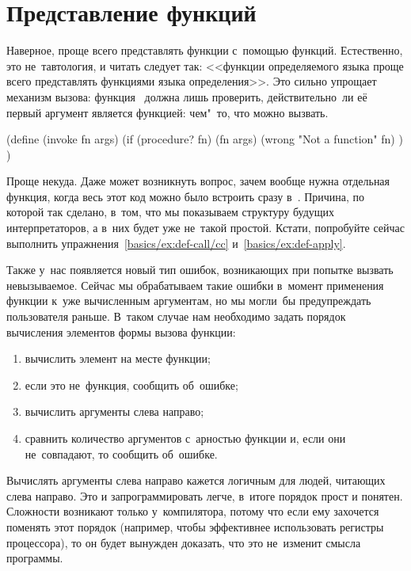 \section{Представление функций}\label{basics/sect:representing-functions}

Наверное, проще всего представлять функции с~помощью функций. Естественно, это
не~тавтология, и читать следует так: <<функции определяемого языка проще всего
представлять функциями языка определения>>. Это сильно упрощает механизм вызова:
функция~ должна лишь проверить, действительно~ли её первый аргумент
является функцией: чем"~то, что можно вызвать.

\begin{code:lisp}
(define (invoke fn args)
  (if (procedure? fn) (fn args)
      (wrong "Not a function" fn) ) )
\end{code:lisp}

Проще некуда. Даже может возникнуть вопрос, зачем вообще нужна отдельная
функция, когда весь этот код можно было встроить сразу в~. Причина,
по которой так сделано, в~том, что мы показываем структуру будущих
интерпретаторов, а в~них  будет уже не~такой простой. Кстати,
попробуйте сейчас выполнить упражнения~\ref{basics/ex:def-call/cc}
и~\ref{basics/ex:def-apply}.

Также у~нас появляется новый тип ошибок, возникающих при попытке вызвать
невызываемое. Сейчас мы обрабатываем такие ошибки в~момент применения функции
к~уже вычисленным аргументам, но мы могли~бы предупреждать пользователя раньше.
В~таком случае нам необходимо задать порядок вычисления элементов формы вызова
функции:

\begin{enumerate}
  \item вычислить элемент на месте функции;

  \item если это не~функция, сообщить об~ошибке;

  \item вычислить аргументы слева направо;

  \item сравнить количество аргументов с~арностью функции
        и, если они не~совпадают, то сообщить об~ошибке.
\end{enumerate}

Вычислять аргументы слева направо кажется логичным для людей, читающих слева
направо. Это и запрограммировать легче, в~итоге порядок прост и понятен.
Сложности возникают только у~компилятора, потому что если ему захочется поменять
этот порядок (например, чтобы эффективнее использовать регистры процессора), то
он будет вынужден доказать, что это не~изменит смысла программы.

